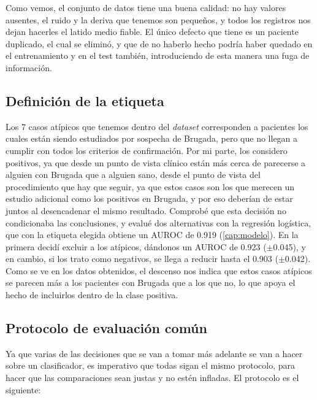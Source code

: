 Como vemos, el conjunto de datos tiene una buena calidad: no hay valores ausentes, el ruido y la deriva que tenemos son pequeños, y todos los registros nos dejan hacerles el latido medio fiable. El único defecto que tiene es un paciente duplicado, el cual se eliminó, y que de no haberlo hecho podría haber quedado en el entrenamiento y en el test también, introduciendo de esta manera una fuga de información.

\subsection{Definición de la etiqueta}\label{sec:etiqueta}

Los 7 casos atípicos que tenemos dentro del \emph{dataset} corresponden a pacientes los cuales están siendo estudiados por sospecha de Brugada, pero que no llegan a cumplir con todos los criterios de confirmación. Por mi parte, los considero positivos, ya que desde un punto de vista clínico están más cerca de parecerse a alguien con Brugada que a alguien sano, desde el punto de vista del procedimiento que hay que seguir, ya que estos casos son los que merecen un estudio adicional como los positivos en Brugada, y por eso deberían de estar juntos al desencadenar el mismo resultado. Comprobé que esta decisión no condicionaba las conclusiones, y evalué dos alternativas con la regresión logística, que con la etiqueta elegida obtiene un AUROC de \num{0.919} (\cref{cap:modelo}). En la primera decidí excluir a los atípicos, dándonos un AUROC de \num{0.923} ($\pm$\num{0.045}), y en cambio, si los trato como negativos, se llega a reducir hasta el \num{0.903} ($\pm$\num{0.042}). Como se ve en los datos obtenidos, el descenso nos indica que estos casos atípicos se parecen más a los pacientes con Brugada que a los que no, lo que apoya el hecho de incluirlos dentro de la clase positiva.

\subsection{Protocolo de evaluación común}\label{sec:protocolo}

Ya que varias de las decisiones que se van a tomar más adelante se van a hacer sobre un clasificador, es imperativo que todas sigan el mismo protocolo, para hacer que las comparaciones sean justas y no estén infladas. El protocolo es el siguiente:

